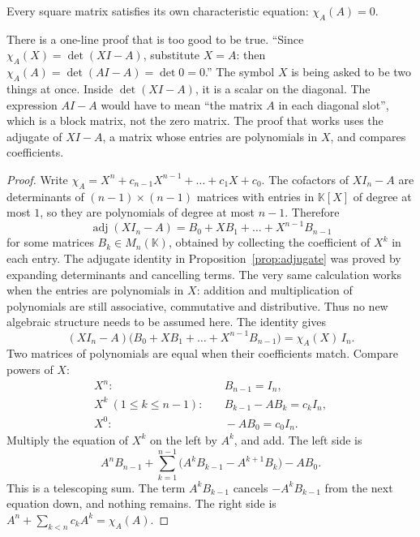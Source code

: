 
\begin{theorem}\label{thm:cayleyhamilton}
Every square matrix satisfies its own characteristic equation: $\chi_A(A)=0$.
\end{theorem}

There is a one-line proof that is too good to be true. ``Since $\chi_A(X)=\det(XI-A)$, substitute $X=A$: then $\chi_A(A)=\det(AI-A)=\det0=0$.'' The symbol $X$ is being asked to be two things at once. Inside $\det(XI-A)$, it is a scalar on the diagonal. The expression $AI-A$ would have to mean ``the matrix $A$ in each diagonal slot'', which is a block matrix, not the zero matrix. The proof that works uses the adjugate of $XI-A$, a matrix whose entries are polynomials in $X$, and compares coefficients.

\begin{proof}
Write $\chi_A=X^n+c_{n-1}X^{n-1}+\dots+c_1X+c_0$. The cofactors of $XI_n-A$ are determinants of $(n-1)\times(n-1)$ matrices with entries in $\mathbb K[X]$ of degree at most $1$, so they are polynomials of degree at most $n-1$. Therefore
\[
\operatorname{adj}(XI_n-A)=B_0+XB_1+\dots+X^{n-1}B_{n-1}
\]
for some matrices $B_k\in M_n(\mathbb K)$, obtained by collecting the coefficient of $X^k$ in each entry. The adjugate identity in Proposition~\ref{prop:adjugate} was proved by expanding determinants and cancelling terms. The very same calculation works when the entries are polynomials in $X$: addition and multiplication of polynomials are still associative, commutative and distributive. Thus no new algebraic structure needs to be assumed here. The identity gives
\[
(XI_n-A)\bigl(B_0+XB_1+\dots+X^{n-1}B_{n-1}\bigr)=\chi_A(X)\,I_n.
\]
Two matrices of polynomials are equal when their coefficients match. Compare powers of $X$:
\[
\begin{aligned}
X^n:&\quad B_{n-1}=I_n,\\
X^k\ (1\le k\le n-1):&\quad B_{k-1}-AB_k=c_kI_n,\\
X^0:&\quad -AB_0=c_0I_n.
\end{aligned}
\]
Multiply the equation of $X^k$ on the left by $A^k$, and add. The left side is
\[
A^nB_{n-1}+\sum_{k=1}^{n-1}\bigl(A^kB_{k-1}-A^{k+1}B_k\bigr)-AB_0.
\]
This is a telescoping sum. The term $A^kB_{k-1}$ cancels $-A^kB_{k-1}$ from the next equation down, and nothing remains. The right side is $A^n+\sum_{k<n}c_kA^k=\chi_A(A)$.
\end{proof}

